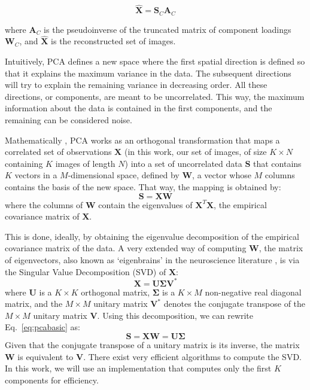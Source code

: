 \begin{equation}\label{eq:swpcareconst}
	\hat{\mathbf{X}}=\mathbf{S}_C \mathbf{A}_C
\end{equation}

where  $\mathbf{A}_C$ is the pseudoinverse of the truncated matrix of
component loadings  $\mathbf{W}_C$, and  $\hat{\mathbf{X}}$ is the
reconstructed set of images.


Intuitively, PCA defines a new space where the first spatial direction is defined so that it explains the maximum variance in the data. The subsequent directions will try to explain the remaining variance in decreasing order. All these directions, or components, are meant to be uncorrelated. This way, the maximum information about the data is contained in the first components, and the remaining can be considered noise. 

Mathematically \cite{Brown2009}, PCA works as an orthogonal transformation that maps a correlated set of observations $\mathbf{X}$ (in this work, our set of images, of size $K\times N$ containing $K$ images of length $N$) into a set of uncorrelated data $\mathbf{S}$ that contains $K$ vectors in a $M$-dimensional space, defined by $\mathbf{W}$, a vector whose $M$ columns contains the basis of the new space. That way, the mapping is obtained by: 
\begin{equation}\label{eq:pcabasic}
\mathbf{S} = \mathbf{X}\mathbf{W}
\end{equation}
where the columns of $\mathbf{W}$ contain the eigenvalues of $\mathbf{X}^T\mathbf{X}$, the empirical covariance matrix of $\mathbf{X}$. 

This is done, ideally, by obtaining the eigenvalue decomposition of the empirical covariance matrix of the data. A very extended way of computing $\mathbf{W}$, the matrix of eigenvectors, also known as `eigenbrains' in the neuroscience literature \cite{Illan2011}, is via the Singular Value Decomposition (SVD) of $\mathbf{X}$:
\begin{equation}
\mathbf{X} = \mathbf{U} \boldsymbol{\Sigma} \mathbf{V}^* 
\end{equation}
where $\mathbf{U}$ is a $K\times K$ orthogonal matrix, $\mathbf{\Sigma}$ is a $K\times M$ non-negative real diagonal matrix, and the $M\times M$ unitary matrix $\mathbf{V}^*$ denotes the conjugate transpose of the $M\times M$ unitary matrix $\mathbf{V}$. Using this decomposition, we can rewrite Eq.~\ref{eq:pcabasic} as: 
\begin{equation}\label{eq:trunkPCA}
\mathbf{S} =  \mathbf{X} \mathbf{W} = \mathbf{U}\mathbf{\Sigma} 
\end{equation}
Given that the conjugate transpose of a unitary matrix is its inverse, the matrix $\mathbf{W}$ is equivalent to $\mathbf{V}$. There exist very efficient algorithms to compute the SVD. In this work, we will use an implementation that computes only the first $K$ components for efficiency.  


